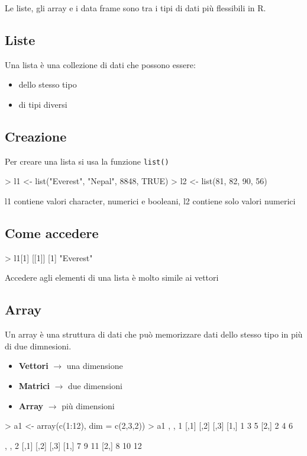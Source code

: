 Le liste, gli array e i data frame sono tra i tipi di dati più flessibili in R.
\subsection{Liste}
Una lista è una collezione di dati che possono essere:
\begin{itemize}
  \item dello stesso tipo
  \item di tipi diversi
\end{itemize}


\subsection*{Creazione}

Per creare una lista si usa la funzione \texttt{list()}

\begin{codiceR}
> l1 <- list("Everest", "Nepal", 8848, TRUE)
> l2 <- list(81, 82, 90, 56)
\end{codiceR}
l1 contiene valori character, numerici e booleani, l2 contiene solo valori numerici

\subsection*{Come accedere}

\begin{codiceR}
> l1[1]
[[1]]
[1] "Everest"
\end{codiceR}
Accedere agli elementi di una lista è molto simile ai vettori

\subsection{Array}

Un array è una struttura di dati che può memorizzare dati dello stesso tipo in più di due dimnesioni.

\begin{itemize}
  \item \textbf{Vettori} $\rightarrow$ una dimensione
  \item \textbf{Matrici} $\rightarrow$ due dimensioni
  \item \textbf{Array} $\rightarrow$ più dimensioni
\end{itemize}


\begin{codiceR}
> a1 <- array(c(1:12), dim = c(2,3,2))
> a1
, , 1
      [,1]  [,2]  [,3]
[1,]    1     3     5
[2,]    2     4     6


, , 2
      [,1]  [,2]  [,3]
[1,]    7     9     11
[2,]    8    10     12
\end{codiceR}


